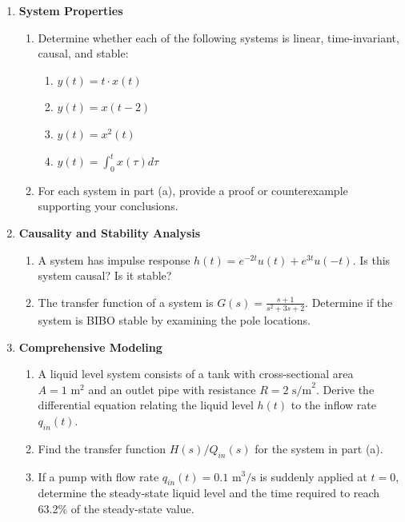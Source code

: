 \begin{enumerate}
\begin{enumerate}
\end{enumerate}

\item \textbf{System Properties}
\begin{enumerate}
\item Determine whether each of the following systems is linear, time-invariant, causal, and stable:
\begin{enumerate}
\item $y(t) = t \cdot x(t)$
\item $y(t) = x(t-2)$
\item $y(t) = x^2(t)$
\item $y(t) = \int_{0}^{t} x(\tau)d\tau$
\end{enumerate}

\item For each system in part (a), provide a proof or counterexample supporting your conclusions.

\end{enumerate}

\item \textbf{Causality and Stability Analysis}
\begin{enumerate}
\item A system has impulse response $h(t) = e^{-2t}u(t) + e^{3t}u(-t)$. Is this system causal? Is it stable?

\item The transfer function of a system is $G(s) = \frac{s+1}{s^2 + 3s + 2}$. Determine if the system is BIBO stable by examining the pole locations.

\end{enumerate}

\item \textbf{Comprehensive Modeling}
\begin{enumerate}
\item A liquid level system consists of a tank with cross-sectional area $A = 1\text{ m}^2$ and an outlet pipe with resistance $R = 2\text{ s/m}^2$. Derive the differential equation relating the liquid level $h(t)$ to the inflow rate $q_{in}(t)$.

\item Find the transfer function $H(s)/Q_{in}(s)$ for the system in part (a).

\item If a pump with flow rate $q_{in}(t) = 0.1\text{ m}^3/\text{s}$ is suddenly applied at $t = 0$, determine the steady-state liquid level and the time required to reach 63.2\% of the steady-state value.


\end{enumerate}
\end{enumerate}
